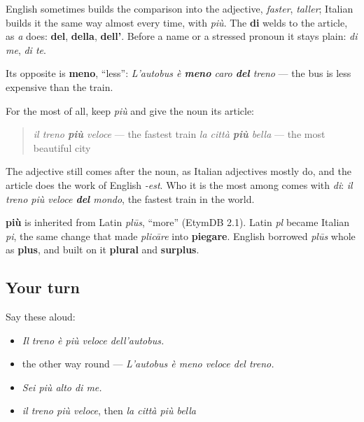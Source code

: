 English sometimes builds the comparison into the adjective, \emph{faster}, \emph{taller}; Italian builds it the same way almost every time, with \emph{più}. The \textbf{di} welds to the article, as \emph{a} does: \textbf{del}, \textbf{della}, \textbf{dell'}. Before a name or a stressed pronoun it stays plain: \emph{di me}, \emph{di te}.

Its opposite is \textbf{meno}, \textquotedblleft{}less\textquotedblright{}: \emph{L'autobus è \textbf{meno} caro \textbf{del} treno} — the bus is less expensive than the train.

\begin{grammarlens}[title={Grammar Lens: il più}]
For the most of all, keep \emph{più} and give the noun its article:

\begin{quote}
\emph{il treno \textbf{più} veloce} — the fastest train \emph{la città \textbf{più} bella} — the most beautiful city
\end{quote}

The adjective still comes after the noun, as Italian adjectives mostly do, and the article does the work of English \emph{-est}. Who it is the most among comes with \emph{di}: \emph{il treno più veloce \textbf{del} mondo}, the fastest train in the world.
\end{grammarlens}

\begin{cousinweb}
\textbf{più} is inherited from Latin \emph{plūs}, \textquotedblleft{}more\textquotedblright{} (EtymDB 2.1). Latin \emph{pl} became Italian \emph{pi}, the same change that made \emph{plicāre} into \textbf{piegare}. English borrowed \emph{plūs} whole as \textbf{plus}, and built on it \textbf{plural} and \textbf{surplus}.
\end{cousinweb}

\subsection*{Your turn}
Say these aloud:

\begin{itemize}
\raggedright
  \item \emph{Il treno è più veloce dell'autobus.}
  \item the other way round — \emph{L'autobus è meno veloce del treno.}
  \item \emph{Sei più alto di me.}
  \item \emph{il treno più veloce}, then \emph{la città più bella}
\end{itemize}

